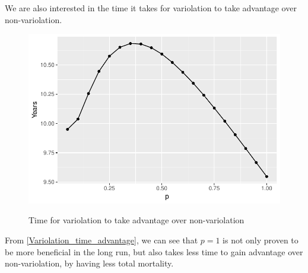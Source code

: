 \documentclass[12pt]{article}
\begin{document}
We are also interested in the time it takes for variolation to take advantage over non-variolation.

\begin{figure}[H]
  \centering\label{Variolation_advantage}
  \includegraphics[width=1\textwidth]                 {Figures/Variolation_advantage_time.pdf}
  \caption{Time for variolation to take advantage over non-variolation}\label{Variolation_time_advantage}
\end{figure}

From \autoref{Variolation_time_advantage}, we can see that $p=1$ is not only proven to be more beneficial in the long run, but also takes less time to gain advantage over non-variolation, by having less total mortality.
\end{document}
